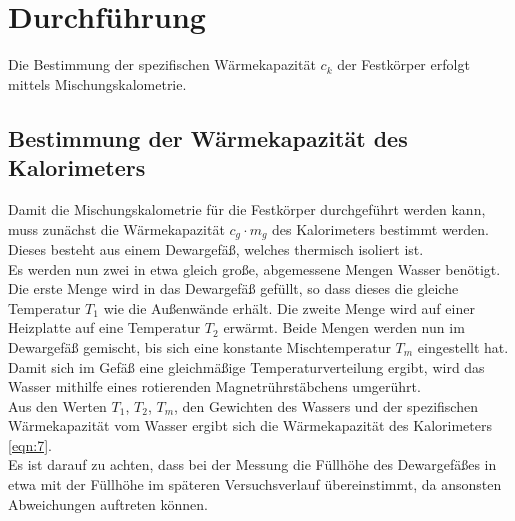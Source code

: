 \section{Durchführung}
\label{sec:Durchführung}

Die Bestimmung der spezifischen Wärmekapazität $c_k$ der Festkörper erfolgt mittels Mischungskalometrie.
\subsection{Bestimmung der Wärmekapazität des Kalorimeters}
Damit die Mischungskalometrie für die Festkörper durchgeführt werden kann, muss zunächst die Wärmekapazität $c_g \cdot m_g$ des Kalorimeters bestimmt werden.
Dieses besteht aus einem Dewargefäß, welches thermisch isoliert ist. \\
Es werden nun zwei in etwa gleich große, abgemessene Mengen Wasser benötigt.
Die erste Menge wird in das Dewargefäß gefüllt, so dass dieses die gleiche Temperatur $T_1$ wie die Außenwände erhält.
Die zweite Menge wird auf einer Heizplatte auf eine Temperatur $T_2$ erwärmt.
Beide Mengen werden nun im Dewargefäß gemischt, bis sich eine konstante Mischtemperatur $T_m$ eingestellt hat.
Damit sich im Gefäß eine gleichmäßige Temperaturverteilung ergibt, wird das Wasser mithilfe eines rotierenden Magnetrührstäbchens umgerührt. \\
Aus den Werten $T_1$, $T_2$, $T_m$, den Gewichten des Wassers und der spezifischen Wärmekapazität vom Wasser ergibt sich die Wärmekapazität des Kalorimeters \ref{eqn:7}. \\
Es ist darauf zu achten, dass bei der Messung die Füllhöhe des Dewargefäßes in etwa mit der Füllhöhe im späteren Versuchsverlauf übereinstimmt, da ansonsten Abweichungen auftreten können.

